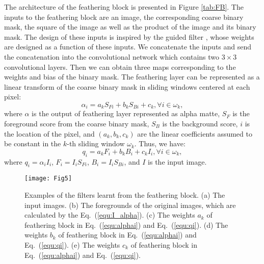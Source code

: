 \documentclass[sigconf]{acmart}
\begin{document}
The architecture of the feathering block is presented in Figure \ref{tab:FB}. The inputs to the feathering block are an image, the corresponding coarse binary mask, the square of the image as well as the product of the image and its binary mask. The design of these inputs is inspired by the guided filter \cite{he2013guided}, whose weights are designed as a function of these inputs. We concatenate the inputs and send the concatenation into the convolutional network which contains two $3 \times 3$ convolutional layers. Then we can obtain three maps corresponding to the weights and bias of the binary mask. The feathering layer can be represented as a linear transform of the coarse binary mask in sliding windows centered at each pixel:
\begin{equation}{\alpha _i} = {a_k}{S_{Fi}} + {b_k}{S_{Bi}} + {c_k},\forall i \in {\omega _k},
 \label{equ:alphai}
\end{equation}
where $\alpha$ is the output of feathering layer represented as alpha matte, ${S_F}$ is the foreground score from the coarse binary mask, ${S_B}$ is the background score, $i$ is the location of the pixel, and $\left( {{a_k},{b_k},{c_k}} \right)$ are the linear coefficients assumed to be constant in the $k$-th sliding window $\omega _k$. Thus, we have:
\begin{equation}{q_i} = {a_k}{F_i} + {b_k}{B_i} + {c_k}{I_i},\forall i \in {\omega _k},
 \label{equ:qi}
\end{equation}
where ${q_i} = {\alpha _i}{I_i}$, ${F_i} = {I_i}{S_{Fi}}$, ${B_i} = {I_i}{S_{Bi}}$, and $I$ is the input image.
\begin{figure*}
\texttt{[image: Fig5]}
\caption{Examples of the filters learnt from the feathering block. (a) The input images. (b) The foregrounds of the original images, which are calculated by the Eq.~(\ref{equ:I_alpha}). (c) The weights ${a_k}$ of feathering block in Eq.~(\ref{equ:alphai}) and Eq.~(\ref{equ:qi}). (d) The weights ${b_k}$ of feathering block in Eq.~(\ref{equ:alphai}) and Eq.~(\ref{equ:qi}). (e) The weights ${c_k}$ of feathering block in Eq.~(\ref{equ:alphai}) and Eq.~(\ref{equ:qi}).}
\label{tab:FBweights}
\end{figure*}
\end{document}

